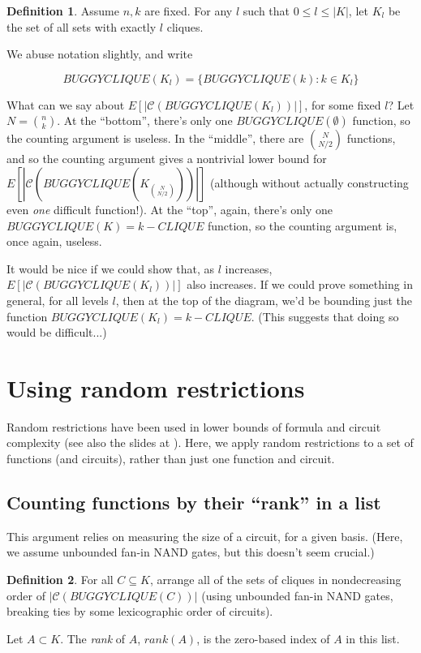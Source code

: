 \documentclass[12pt]{article}
\theoremstyle{definition}
\newtheorem{defn}{Definition}[section]
\newcommand{\bigC}[0]{\mathcal{C}}
\begin{document}
\begin{defn}
\label{CLIQUE-level}
Assume $n, k$ are fixed. For any $l$ such that
$0 \le l \le |K|$, let $K_l$ be the set of all sets
with exactly $l$ cliques. 
\end{defn}

We abuse notation slightly, and write

\[
BUGGYCLIQUE(K_l) = \{ BUGGYCLIQUE(k) : k \in K_l \}
\]

What can we say about $E[|\bigC(BUGGYCLIQUE(K_l))|]$, for
some fixed $l$? Let $N = {n \choose k}$.
At the ``bottom'', there's only one $BUGGYCLIQUE(\emptyset)$
function, so the counting argument is useless.
In the ``middle'',
there are ${N \choose {N/2}}$ functions, and so the counting
argument gives a nontrivial lower bound for
$E[|\bigC(BUGGYCLIQUE(K_{N \choose {N/2}}))|]$ (although
without actually constructing even {\em one} difficult function!).
At the ``top'', again, there's only one $BUGGYCLIQUE(K) = k-CLIQUE$
function, so the counting argument is, once again, useless.

It would be nice if we could show that, as $l$ increases,
$E[|\bigC(BUGGYCLIQUE(K_l))|]$ also increases.
If we could prove something in general, for all levels $l$, then at
the top of the diagram, we'd be bounding just the function
$BUGGYCLIQUE(K_l) = k-CLIQUE$. (This suggests that doing so would
be difficult...)


\section{Using random restrictions}

Random restrictions have been used in lower bounds of formula
\cite{subbotovskaya1963comparison} and circuit \cite{hastad1987lower}
complexity (see also the slides at \cite{rossmanRestrictions}).
Here, we apply random restrictions to a set of functions (and circuits),
rather than just one function and circuit.

\subsection{Counting functions by their ``rank'' in a list}

This argument relies on measuring the size of a circuit,
for a given basis. (Here, we assume unbounded fan-in
NAND gates, but this doesn't seem crucial.)

\begin{defn}
\label{Rank}
For all $C \subseteq K$,
arrange all of the sets of cliques in nondecreasing order
of $|\bigC(BUGGYCLIQUE(C))|$ (using unbounded fan-in NAND gates,
breaking ties by some lexicographic order of circuits).

Let $A \subset K$. The {\em rank} of $A$, $rank(A)$, is the zero-based
index of $A$ in this list.
\end{defn}
\end{document}
